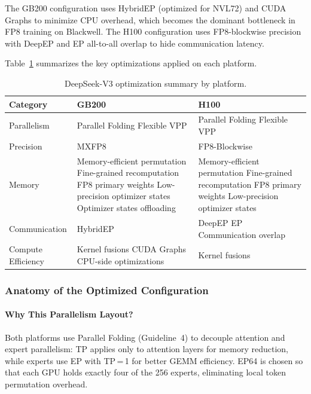 The GB200 configuration uses HybridEP (optimized for NVL72) and CUDA Graphs to minimize CPU overhead, which becomes the dominant bottleneck in FP8 training on Blackwell. The H100 configuration uses FP8-blockwise precision with DeepEP and EP all-to-all overlap to hide communication latency.

Table~\ref{tab:deepseekv3-journey} summarizes the key optimizations applied on each platform.

\begin{table}[ht]
\centering
\caption{DeepSeek-V3 optimization summary by platform.}
\label{tab:deepseekv3-journey}
\begin{tabular}{lp{5cm}p{5cm}}
\toprule
\textbf{Category} & \textbf{GB200} & \textbf{H100} \\
\midrule
Parallelism & Parallel Folding \newline Flexible VPP & Parallel Folding \newline Flexible VPP \\
\midrule
Precision & MXFP8 & FP8-Blockwise \\
\midrule
Memory & Memory-efficient permutation \newline Fine-grained recomputation \newline FP8 primary weights \newline Low-precision optimizer states \newline Optimizer states offloading & Memory-efficient permutation \newline Fine-grained recomputation \newline FP8 primary weights \newline Low-precision optimizer states \\
\midrule
Communication & HybridEP & DeepEP \newline EP Communication overlap \\
\midrule
Compute Efficiency & Kernel fusions \newline CUDA Graphs \newline CPU-side optimizations & Kernel fusions \\
\bottomrule
\end{tabular}
\end{table}

\subsubsection{Anatomy of the Optimized Configuration}

\paragraph*{Why This Parallelism Layout?}
Both platforms use Parallel Folding (Guideline~4) to decouple attention and expert parallelism: TP applies only to attention layers for memory reduction, while experts use EP with TP\,=\,1 for better GEMM efficiency. EP64 is chosen so that each GPU holds exactly four of the 256 experts, eliminating local token permutation overhead.

